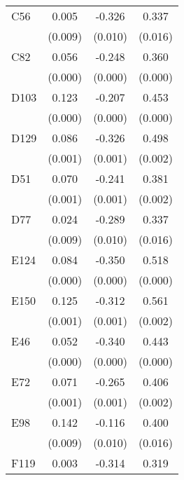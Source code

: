 \begin{table}[htbp]
\begin{tabular}{l*{3}{c}}
C56             &    0.005         &   -0.326\sym{***}&    0.337\sym{***}\\
                &  (0.009)         &  (0.010)         &  (0.016)         \\
C82             &    0.056\sym{***}&   -0.248\sym{***}&    0.360\sym{***}\\
                &  (0.000)         &  (0.000)         &  (0.000)         \\
D103            &    0.123\sym{***}&   -0.207\sym{***}&    0.453\sym{***}\\
                &  (0.000)         &  (0.000)         &  (0.000)         \\
D129            &    0.086\sym{***}&   -0.326\sym{***}&    0.498\sym{***}\\
                &  (0.001)         &  (0.001)         &  (0.002)         \\
D51             &    0.070\sym{***}&   -0.241\sym{***}&    0.381\sym{***}\\
                &  (0.001)         &  (0.001)         &  (0.002)         \\
D77             &    0.024\sym{**} &   -0.289\sym{***}&    0.337\sym{***}\\
                &  (0.009)         &  (0.010)         &  (0.016)         \\
E124            &    0.084\sym{***}&   -0.350\sym{***}&    0.518\sym{***}\\
                &  (0.000)         &  (0.000)         &  (0.000)         \\
E150            &    0.125\sym{***}&   -0.312\sym{***}&    0.561\sym{***}\\
                &  (0.001)         &  (0.001)         &  (0.002)         \\
E46             &    0.052\sym{***}&   -0.340\sym{***}&    0.443\sym{***}\\
                &  (0.000)         &  (0.000)         &  (0.000)         \\
E72             &    0.071\sym{***}&   -0.265\sym{***}&    0.406\sym{***}\\
                &  (0.001)         &  (0.001)         &  (0.002)         \\
E98             &    0.142\sym{***}&   -0.116\sym{***}&    0.400\sym{***}\\
                &  (0.009)         &  (0.010)         &  (0.016)         \\
F119            &    0.003         &   -0.314\sym{***}&    0.319\sym{***}\\

\end{tabular}
\end{table}

